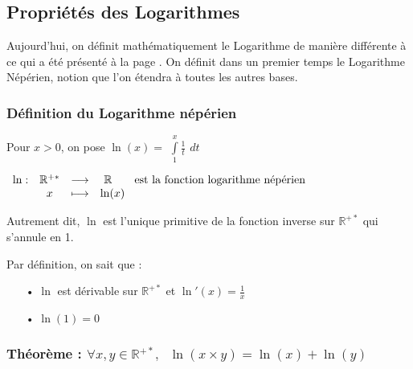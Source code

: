\documentclass[a4paper]{article}
\begin{document}
\vfill
\vfill
\vfill
\vfill
\vfill

\pagebreak




\subsection{Propriétés des Logarithmes}\label{demo_propriete_log} 

Aujourd'hui, on définit mathématiquement le Logarithme de manière différente à ce qui a été présenté à la page \pageref{intro_log}. On définit dans un premier temps le Logarithme Népérien, notion que l'on étendra à toutes les autres bases.

\subsubsection*{Définition du Logarithme népérien}

Pour $x>0$, on pose $\ln(x) =$ {\Large $\int\limits_1^x \frac{1}{t}$} {\large $dt$}\\

\vspace{-3 mm}

\begin{center}
\begin{large}
$\begin{array}{lccl}
\ln : & \mathbb{R}^{+*} & \longrightarrow & ~ \mathbb{R} ~~~~~~ \text{{\normalsize est la fonction logarithme népérien}}\\
    & x & \longmapsto & \ln(x)
\end{array}$
\end{large}
\end{center}

Autrement dit, $\ln$ est l'unique primitive de la fonction inverse sur $\mathbb{R}^{+*}$ qui s'annule en 1.

\vspace{3 mm}

Par définition, on sait que :
\begin{itemize}
	\item[•] $\ln$ est dérivable sur $\mathbb{R}^{+*}$ et $\ln '(x) = \frac{1}{x}$
	\item[•] $\ln(1)=0$\\
\end{itemize}





\subsubsection*{Théorème : $\forall x, y \in \mathbb{R}^{+*},$ {\Large $~\ln(x\times y) = \ln(x) + \ln(y)$}}
\end{document}
